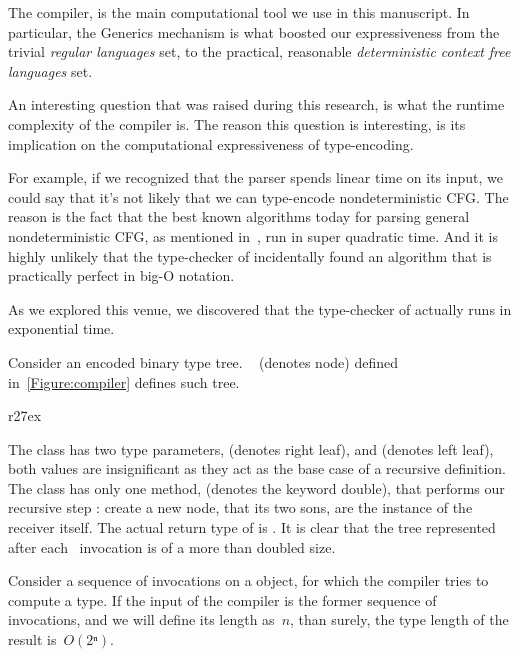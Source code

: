 The \Java compiler, is the main computational tool we use
  in this manuscript.
In particular, the \Java Generics mechanism is what
  boosted our expressiveness from the trivial \emph{regular languages}
  set, to the practical, reasonable \emph{deterministic context free languages} set.

An interesting question that was raised during this research,
  is what the runtime complexity of the \Java compiler is.
The reason this question is interesting, is its implication
  on the computational expressiveness of type-encoding.

For example, if we recognized that the \Java parser spends
  linear time on its input, we could say that it's not
  likely that we can type-encode nondeterministic CFG.
The reason is the fact that the best known algorithms
  today for parsing general nondeterministic CFG,
  as mentioned in~, run in super quadratic time.
And it is highly unlikely that the type-checker of \Java incidentally
  found an algorithm that is practically perfect in big-O notation.

As we explored this venue, we discovered that the type-checker of
  \Java actually runs in exponential time.

Consider an encoded binary type tree. ~
  (denotes node) defined in~\cref{Figure:compiler} defines such tree.

\begin{wrapfigure}[6]r{27ex}
  \caption{\label{Figure:compiler} Encoding of an binary type tree}
\end{wrapfigure}

The class has two type parameters,  (denotes right leaf),
  and  (denotes left leaf), both values are insignificant
  as they act as the base case of a recursive definition.
The class has only one method,  (denotes the keyword double),
  that performs our recursive step : create a new node, that its two
  sons, are the instance of the receiver itself.
The actual return type of  is
  .
It is clear that the tree represented after each~ invocation is
  of a more than doubled size.

Consider a sequence of  invocations on a   object,
  for which the \Java compiler tries to compute a type.
If the input of the compiler is the former sequence of invocations,
  and we will define its length as~$n$,
  than surely, the type length of the result is~$O(2ⁿ)$.

